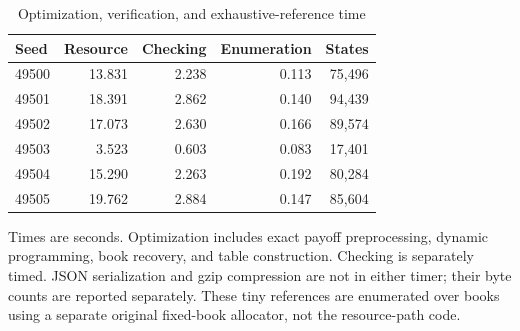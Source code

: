 \begin{table}[p]\centering
\caption{Optimization, verification, and exhaustive-reference time}\label{tab:timeec52}
\setlength{\tabcolsep}{4pt}
\begin{tabular}{lrrrr}
\toprule
Seed & Resource & Checking & Enumeration & States\\
\midrule
49500 & 13.831 & 2.238 & 0.113 & 75,496\\
49501 & 18.391 & 2.862 & 0.140 & 94,439\\
49502 & 17.073 & 2.630 & 0.166 & 89,574\\
49503 & 3.523 & 0.603 & 0.083 & 17,401\\
49504 & 15.290 & 2.263 & 0.192 & 80,284\\
49505 & 19.762 & 2.884 & 0.147 & 85,604\\
\bottomrule\end{tabular}
\par\vspace{6pt}\begin{minipage}{\textwidth}Times are seconds. Optimization includes exact payoff preprocessing, dynamic programming, book recovery, and table construction. Checking is separately timed. JSON serialization and gzip compression are not in either timer; their byte counts are reported separately. These tiny references are enumerated over books using a separate original fixed-book allocator, not the resource-path code.\end{minipage}
\end{table}
